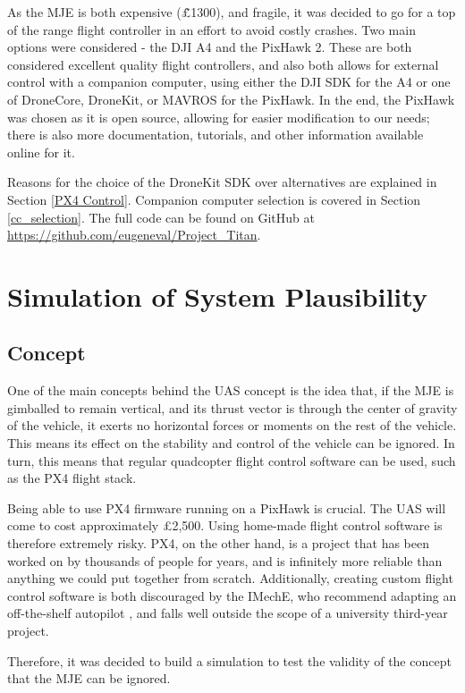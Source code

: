 \documentclass[11pt]{article}
\begin{document}
As the MJE is both expensive (\~\pounds1300), and fragile, it was decided to go for a top of the range flight controller in an effort to avoid costly crashes. Two main options were considered - the DJI A4 and the PixHawk 2. These are both considered excellent quality flight controllers, and also both allows for external control with a companion computer, using either the DJI SDK for the A4 or one of DroneCore, DroneKit, or MAVROS for the PixHawk. In the end, the PixHawk was chosen as it is open source, allowing for easier modification to our needs; there is also more documentation, tutorials, and other information available online for it.

Reasons for the choice of the DroneKit SDK over alternatives are explained in Section \ref{PX4 Control}. Companion computer selection is covered in Section \ref{cc_selection}. The full code can be found on GitHub at \url{https://github.com/eugeneval/Project_Titan}.


\section{Simulation of System Plausibility} \label{simulation}
\subsection{Concept}
One of the main concepts behind the UAS concept is the idea that, if the MJE is gimballed to remain vertical, and its thrust vector is through the center of gravity of the vehicle, it exerts no horizontal forces or moments on the rest of the vehicle. This means its effect on the stability and control of the vehicle can be ignored. In turn, this means that regular quadcopter flight control software can be used, such as the PX4 flight stack.

Being able to use PX4 firmware running on a PixHawk is crucial. The UAS will come to cost approximately \pounds2,500. Using home-made flight control software is therefore extremely risky. PX4, on the other hand, is a project that has been worked on by thousands of people for years, and is infinitely more reliable than anything we could put together from scratch. Additionally, creating custom flight control software is both discouraged by the IMechE, who recommend adapting an off-the-shelf autopilot \cite{IMechE_rules}, and falls well outside the scope of a university third-year project.

Therefore, it was decided to build a simulation to test the validity of the concept that the MJE can be ignored.
\end{document}
